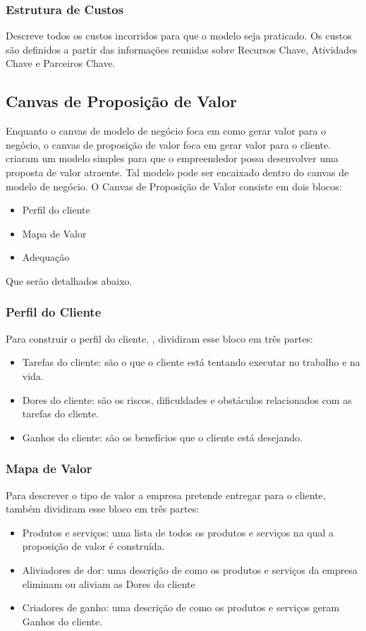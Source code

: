\subsubsection{Estrutura de Custos}
\label{cha:estrutura_de_custos}
Descreve todos os custos incorridos para que o modelo seja praticado. Os custos são definidos a partir das informações reunidas sobre Recursos Chave, Atividades Chave e Parceiros Chave. \cite{businessmodel}

\subsection{Canvas de Proposição de Valor}
\label{cha:canvas_de_proposicao_de_valor}
Enquanto o canvas de modelo de negócio foca em como gerar valor para o negócio, o canvas de proposição de valor foca em gerar valor para o cliente.
 criaram um modelo simples para que o empreendedor possa desenvolver uma proposta de valor atraente. Tal modelo pode ser encaixado dentro do canvas de modelo de negócio. 
O Canvas de Proposição de Valor consiste em dois blocos:
\begin{itemize}
\item Perfil do cliente
\item Mapa de Valor
\item Adequação
\end{itemize}
Que serão detalhados abaixo.

\subsubsection{Perfil do Cliente}
\label{cha:perfil_do_cliente}
Para construir o perfil do cliente, , dividiram esse bloco em três partes:
\begin{itemize}
\item Tarefas do cliente: são o que o cliente está tentando executar no trabalho e na vida.
\item Dores do cliente: são os riscos, dificuldades e obstáculos relacionados com as tarefas do cliente.
\item Ganhos do cliente: são os benefícios que o cliente está desejando. \cite{valueproposition}
\end{itemize}

\subsubsection{Mapa de Valor}
\label{cha:mapa_de_valor}
Para descrever o tipo de valor a empresa pretende entregar para o cliente, também dividiram esse bloco em três partes:
\begin{itemize}
\item Produtos e serviços: uma lista de todos os produtos e serviços na qual a proposição de valor é construída.
\item Aliviadores de dor: uma descrição de como os produtos e serviços da empresa eliminam ou aliviam as Dores do cliente
\item Criadores de ganho: uma descrição de como os produtos e serviços geram Ganhos do cliente. \cite{valueproposition}
\end{itemize}

